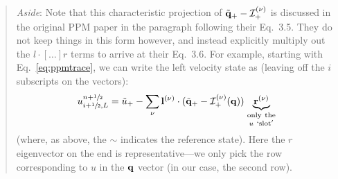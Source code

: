 \begin{quote}
\noindent\makebox[\linewidth]{\rule{0.9\textwidth}{1pt}}
{\em Aside}:
Note that this characteristic projection of $\tilde{{\bf q}}_+ -
{\mathcal{I}}_+^{(\nu)}$ is discussed in the original PPM paper in the
paragraph following their Eq.~3.5.  They do not keep things in this form
however, and instead explicitly multiply out the $l\cdot [\ldots] r$
terms to arrive at their Eq.~3.6.  For example, starting with
Eq.~\ref{eq:ppmtrace},
we can write the left velocity state as (leaving off the $i$
subscripts on the vectors):
\begin{equation}
u_{i+{\sfrac{1}{2}},L}^{n+{\sfrac{1}{2}}} =
  \tilde{u}_+ - \sum_\nu {\bf l}^{(\nu)} \cdot
      ( \tilde{{\bf q}}_+ -  {\mathcal{I}}_+^{(\nu)}({\bf q}) )
    \underbrace{{\bf r}^{(\nu)}}_{\begin{smallmatrix}\mathrm{only~the}\\ u~\mathrm{`slot'} \end{smallmatrix}}
\end{equation}
(where, as above, the $\sim$ indicates the reference state).
Here the $r$ eigenvector on the end is representative---we only pick
the row corresponding to $u$ in the ${\bf q}$ vector (in our case, the
second row).


\end{quote}
